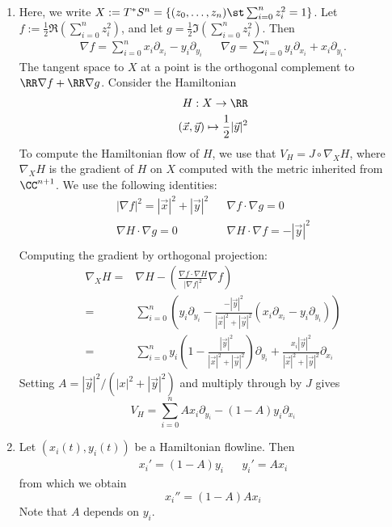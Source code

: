 
 
\begin{enumerate}
    \item Here, we write $X:=T^*S^n=\{(z_0, \ldots, z_n)\st \sum_{i=0}^n z_i^2=1\}$. Let $f:= \frac{1}{2}\Re\left(\sum_{i=0}^n z_i^2\right)$, and let $g=\frac{1}{2}\Im\left(\sum_{i=0}^n z_i^2\right)$. Then 
 \begin{align*}
    \nabla f = \sum_{i=0}^n x_i \partial_{x_i}- y_i \partial_{y_i} && \nabla g = \sum_{i=0}^n y_i \partial_{x_i} + x_i \partial_{y_i}.
 \end{align*}
The tangent space to $X$ at a point is the orthogonal complement to $\RR \nabla f + \RR \nabla g$. Consider the Hamiltonian 
\begin{align*}
    H: X\to \RR\\
    (\vec x, \vec y )\mapsto \frac{1}{2}|\vec y|^2
\end{align*}
To compute the Hamiltonian flow of $H$, we use that  $V_H=J\circ  \nabla_{X} H$, where $\nabla_X H$ is the gradient of $H$ on $X$ computed with the metric inherited from $\CC^{n+1}$.  We use the following identities:
\begin{align*}
    |\nabla f |^2 = |\vec x|^2+|\vec y|^2 &&  \nabla f \cdot    \nabla g = 0 \\
    \nabla H \cdot \nabla g = 0 && \nabla H \cdot \nabla f = -|\vec y |^2\\
\end{align*}
Computing the gradient by orthogonal projection:
\begin{align*}
    \nabla_X H =& \nabla H - \left(\frac{\nabla f \cdot \nabla H}{|\nabla f|^2}\nabla f \right)\\
    =& \sum_{i=0}^n\left(y_i \partial_{y_i}- \frac{-|\vec y|^2}{|\vec x|^2+ |\vec y|^2}( x_i \partial_{x_i}- y_i \partial_{y_i})\right) \\
    =& \sum_{i=0}^n y_i\left(1- \frac{|\vec y|^2}{|\vec x|^2 +|\vec y|^2}\right) \partial_{y_i}+ \frac{x_i|\vec y|^2}{|\vec x|^2 +|\vec y|^2}\partial_{x_i}
\end{align*}
Setting $A= |\vec y|^2/(|x|^2+|\vec y|^2)$ and multiply through by $J$ gives
\[V_H= \sum_{i=0}^n Ax_i \partial_{y_i} - (1-A)y_i \partial_{x_i}\]
\item
Let $(x_i(t), y_i(t))$ be a Hamiltonian flowline. Then 
\begin{align*}
    x_i'=(1-A) y_i && y_i'=A x_i
\end{align*}
from which we obtain 
\[x_i''=(1-A) A x_i\]
Note that $A$ depends on $y_i$.


\end{enumerate}
